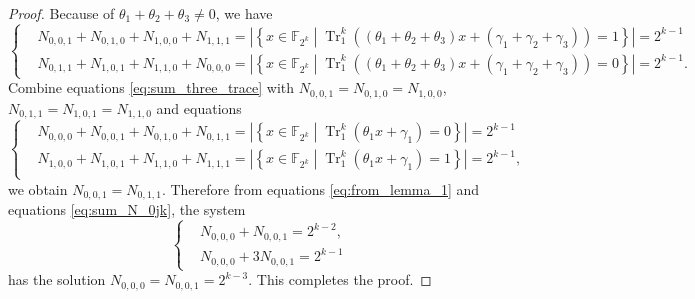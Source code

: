 \documentclass{article}
\newcommand{\F}{\mathbb{F}}
\newcommand{\TRACE}{\operatorname{Tr}_1^k}
\theoremstyle{nonumberplain}
\newtheorem{proof}{Proof}
\newcommand{\0}{\textbf{0}}
\newcommand{\1}{\textbf{1}}
\begin{document}
\begin{proof}
    Because of $ \theta_1+\theta_2+\theta_3\ne 0 $, we have 
    \begin{equation}\label{eq:sum_three_trace} \left\{\begin{alignedat}{2}
         &N_{0,0,1}+N_{0,1,0}+N_{1,0,0}+N_{1,1,1}=\left\lvert\left\{x\in\F_{2^k}\middle|\TRACE\left(\left(\theta_1+\theta_2+\theta_3\right)x+\left(\gamma_1+\gamma_2+\gamma_3\right)\right)=1\right\}\right\rvert=2^{k-1}\\
         &N_{0,1,1}+N_{1,0,1}+N_{1,1,0}+N_{0,0,0}=\left\lvert\left\{x\in\F_{2^k}\middle|\TRACE\left(\left(\theta_1+\theta_2+\theta_3\right)x+\left(\gamma_1+\gamma_2+\gamma_3\right)\right)=0\right\}\right\rvert=2^{k-1}.
      \end{alignedat}\right.\end{equation}
    Combine equations \eqref{eq:sum_three_trace} with $ N_{0,0,1}=N_{0,1,0}=N_{1,0,0} $, $ N_{0,1,1}=N_{1,0,1}=N_{1,1,0} $ and equations  
    \begin{equation}\label{eq:sum_N_0jk}\left\{\begin{alignedat}{2}
        &N_{0,0,0}+N_{0,0,1}+N_{0,1,0}+N_{0,1,1}=\left\lvert\left\{x\in\F_{2^k}\middle|\TRACE\left(\theta_1x+\gamma_1\right)=0\right\}\right\rvert=2^{k-1}\\
        &N_{1,0,0}+N_{1,0,1}+N_{1,1,0}+N_{1,1,1}=\left\lvert\left\{x\in\F_{2^k}\middle|\TRACE\left(\theta_1x+\gamma_1\right)=1\right\}\right\rvert=2^{k-1},\\
    \end{alignedat}\right.\end{equation}
    we obtain $ N_{0,0,1}=N_{0,1,1} $. 
    Therefore from equations \eqref{eq:from_lemma_1} and equations \eqref{eq:sum_N_0jk}, the system 
    \begin{equation}\left\{\begin{alignedat}{2}
        &N_{0,0,0}+N_{0,0,1}=2^{k-2},\\
        &N_{0,0,0}+3N_{0,0,1}=2^{k-1} 
    \end{alignedat}\right.\end{equation}
    has the solution $ N_{0,0,0}=N_{0,0,1}=2^{k-3} $. This completes the proof.
\end{proof}
    
\end{document}
